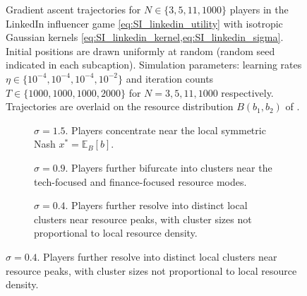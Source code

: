 \documentclass{article}
\begin{document}
\begin{figure}[ht!]
            \caption{Gradient ascent trajectories for $N \in \{3, 5, 11, 1000\}$ players in the LinkedIn influencer game \cref{eq:SI_linkedin_utility} with isotropic Gaussian kernels \cref{eq:SI_linkedin_kernel,eq:SI_linkedin_sigma}.
                Initial positions are drawn uniformly at random (random seed indicated in each subcaption).
                Simulation parameters: learning rates $\eta \in \{10^{-4}, 10^{-4}, 10^{-4}, 10^{-2}\}$ and iteration counts $T \in \{1000, 1000, 1000, 2000\}$ for $N = 3, 5, 11, 1000$ respectively.
                Trajectories are overlaid on the resource distribution $B(b_1, b_2)$ of .}
            \label{fig:linkedin_trajectories}
        \end{figure}
        \clearpage

        \begin{figure}[ht!]
            \centering
            \begin{subfigure}[b]{0.45\linewidth}
                \centering
                
                \caption{$\sigma = 1.5$.
                    Players concentrate near the local symmetric Nash $x^* = \mathbb{E}_B[b]$.}
                \label{fig:linkedin_density:a}
                \vspace{4ex}
            \end{subfigure}
            \begin{subfigure}[b]{0.45\linewidth}
                \centering
                
                \caption{$\sigma = 0.9$. Players further bifurcate into clusters near the tech-focused and finance-focused resource modes.}
                \label{fig:linkedin_density:b}
                \vspace{4ex}
            \end{subfigure}
            \begin{subfigure}[b]{0.45\linewidth}
                \centering
                
                \caption{$\sigma = 0.4$.
                    Players further resolve into distinct local clusters near resource peaks, with cluster sizes not proportional to local resource density.}
                \label{fig:linkedin_density:c}
                \vspace{4ex}

\end{subfigure}
\end{figure}
\end{document}
